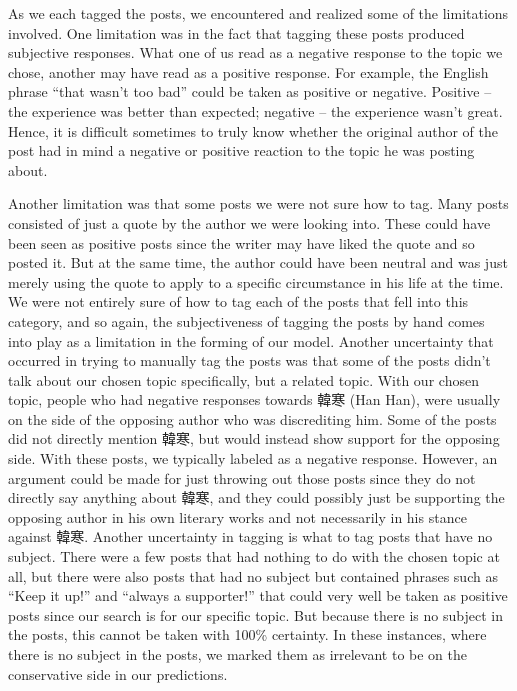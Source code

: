 \documentclass[11pt]{article}
\newcommand{\1}[1]{{\mathbf 1}\left\{#1\right\}}        %
\begin{document}
As we each tagged the posts, we encountered and realized some of the limitations involved. One limitation was in the fact that tagging these posts produced subjective responses.  What one of us read as a negative response to the topic we chose, another may have read as a positive response.  For example, the English phrase ``that wasn't too bad'' could be taken as positive or negative.  Positive -- the experience was better than expected; negative -- the experience wasn't great. Hence, it is difficult sometimes to truly know whether the original author of the post had in mind a negative or positive reaction to the topic he was posting about.  

Another limitation was that some posts we were not sure how to tag. Many posts consisted of just a quote by the author we were looking into.  These could have been seen as positive posts since the writer may have liked the quote and so posted it. But at the same time, the author could have been neutral and was just merely using the quote to apply to a specific circumstance in his life at the time. We were not entirely sure of how to tag each of the posts that fell into this category, and so again, the subjectiveness of tagging the posts by hand comes into play as a limitation in the forming of our model.  Another uncertainty that occurred in trying to manually tag the posts was that some of the posts didn't talk about our chosen topic specifically, but a related topic.  With our chosen topic, people who had negative responses towards 韓寒 (Han Han), were usually on the side of the opposing author who was discrediting him.  Some of the posts did not directly mention 韓寒, but would instead show support for the opposing side. With these posts, we typically labeled as a negative response.  However, an argument could be made for just throwing out those posts since they do not directly say anything about 韓寒, and they could possibly just be supporting the opposing author in his own literary works and not necessarily in his stance against 韓寒.  Another uncertainty in tagging is what to tag posts that have no subject.  There were a few posts that had nothing to do with the chosen topic at all, but there were also posts that had no subject but contained phrases such as ``Keep it up!'' and ``always a supporter!'' that could very well be taken as positive posts since our search is for our specific topic. But because there is no subject in the posts, this cannot be taken with 100\% certainty. In these instances, where there is no subject in the posts, we marked them as irrelevant to be on the conservative side in our predictions. 
\end{document}
